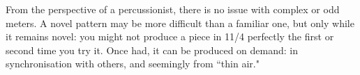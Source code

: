 From the perspective of a percussionist, there is no issue with complex or odd meters. A novel pattern may be more difficult than a familiar one, but only while it remains novel: you might not produce a piece in 11/4 perfectly the first or second time you try it. Once had, it can be produced on demand: in synchronisation with others, and seemingly from ``thin air."









%
%
%
%
%
%
%
%
%
%
%
%
%
%
%
%
%
%
